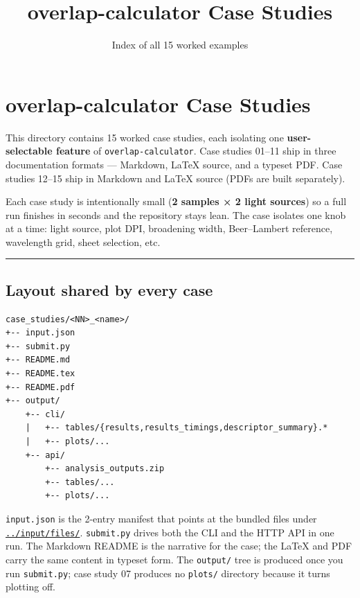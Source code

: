 \documentclass[
  11pt,
]{article}
\title{overlap-calculator Case Studies}
\subtitle{Index of all 15 worked examples}
\author{}
\date{}
\begin{document}
\maketitle

{
\hypersetup{linkcolor=}
\setcounter{tocdepth}{2}
\tableofcontents
}
\hypertarget{overlap-calculator-case-studies}{
\section{overlap-calculator Case
Studies}\label{overlap-calculator-case-studies}}

This directory contains 15 worked case studies, each isolating one
\textbf{user-selectable feature} of \texttt{overlap-calculator}. Case
studies 01--11 ship in three documentation formats --- Markdown, LaTeX
source, and a typeset PDF. Case studies 12--15 ship in Markdown and
LaTeX source (PDFs are built separately).

Each case study is intentionally small (\textbf{2 samples × 2 light
sources}) so a full run finishes in seconds and the repository stays
lean. The case isolates one knob at a time: light source, plot DPI,
broadening width, Beer--Lambert reference, wavelength grid, sheet
selection, etc.

\begin{center}\rule{0.5\linewidth}{0.5pt}\end{center}

\hypertarget{layout-shared-by-every-case}{
\subsection{Layout shared by every
case}\label{layout-shared-by-every-case}}

\begin{verbatim}
case_studies/<NN>_<name>/
+-- input.json
+-- submit.py
+-- README.md
+-- README.tex
+-- README.pdf
+-- output/
    +-- cli/
    |   +-- tables/{results,results_timings,descriptor_summary}.*
    |   +-- plots/...
    +-- api/
        +-- analysis_outputs.zip
        +-- tables/...
        +-- plots/...
\end{verbatim}

\texttt{input.json} is the 2-entry manifest that points at the bundled
files under
\href{https://github.com/pinarsyt/overlap-calculator/blob/main/input/files}{\texttt{../input/files/}}.
\texttt{submit.py} drives both the CLI and the HTTP API in one run. The
Markdown README is the narrative for the case; the LaTeX and PDF carry
the same content in typeset form. The \texttt{output/} tree is produced
once you run \texttt{submit.py}; case study 07 produces no
\texttt{plots/} directory because it turns plotting off.
\end{document}
